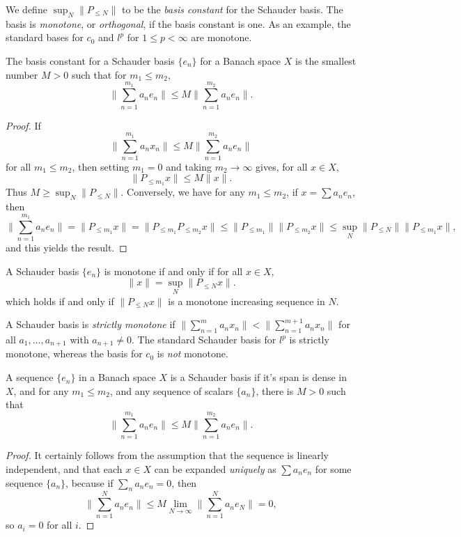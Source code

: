 We define $\sup_N \| P_{\leq N} \|$ to be the \emph{basis constant} for the Schauder basis. The basis is \emph{monotone}, or \emph{orthogonal}, if the basis constant is one. As an example, the standard bases for $c_0$ and $l^p$ for $1 \leq p < \infty$ are monotone.

\begin{theorem}
    The basis constant for a Schauder basis $\{ e_n \}$ for a Banach space $X$ is the smallest number $M > 0$ such that for $m_1 \leq m_2$,
    \[ \| \sum_{n = 1}^{m_1} a_n e_n \| \leq M \| \sum_{n = 1}^{m_2} a_n e_n \|. \]
\end{theorem}
\begin{proof}
    If
    \[ \| \sum_{n = 1}^{m_1} a_n x_n \| \leq M \| \sum_{n = 1}^{m_2} a_n e_n \| \]
    for all $m_1 \leq m_2$, then setting $m_1 = 0$ and taking $m_2 \to \infty$ gives, for all $x \in X$,
    \[ \| P_{\leq m_1} x \| \leq M \| x \|. \]
    Thus $M \geq \sup_N \| P_{\leq N} \|$. Conversely, we have for any $m_1 \leq m_2$, if $x = \sum a_n e_n$, then
    \[ \| \sum_{n = 1}^{m_1} a_n e_n \| = \| P_{\leq m_1} x \| = \| P_{\leq m_1} P_{\leq m_2} x \| \leq \| P_{\leq m_1} \| \| P_{\leq m_2} x \| \leq \sup_N \| P_{\leq N} \| \| P_{\leq m_1} x \|, \]
    and this yields the result.
\end{proof}

\begin{corollary}
    A Schauder basis $\{ e_n \}$ is monotone if and only if for all $x \in X$,
    \[ \| x \| = \sup_N \| P_{\leq N} x \|. \]
    which holds if and only if $\| P_{\leq N} x \|$ is a monotone increasing sequence in $N$.
\end{corollary}

A Schauder basis is \emph{strictly monotone} if $\| \sum_{n = 1}^m a_n x_n \| < \| \sum_{n = 1}^{m+1} a_n x_n \|$ for all $a_1, \dots, a_{n+1}$ with $a_{n+1} \neq 0$. The standard Schauder basis for $l^p$ is strictly monotone, whereas the basis for $c_0$ is \emph{not} monotone.

\begin{theorem}
    A sequence $\{ e_n \}$ in a Banach space $X$ is a Schauder basis if it's span is dense in $X$, and for any $m_1 \leq m_2$, and any sequence of scalars $\{ a_n \}$, there is $M > 0$ such that
    \[ \| \sum_{n = 1}^{m_1} a_n e_n \| \leq M \| \sum_{n = 1}^{m_2} a_n e_n \|. \]
\end{theorem}
\begin{proof}
    It certainly follows from the assumption that the sequence is linearly independent, and that each $x \in X$ can be expanded \emph{uniquely} as $\sum a_n e_n$ for some sequence $\{ a_n \}$, because if $\sum_n a_n e_n = 0$, then
    \[ \| \sum_{n = 1}^N a_n e_n \| \leq M \lim_{N \to \infty} \| \sum_{n = 1}^N a_n e_N \| = 0, \]
    so $a_i = 0$ for all $i$.
\end{proof}

